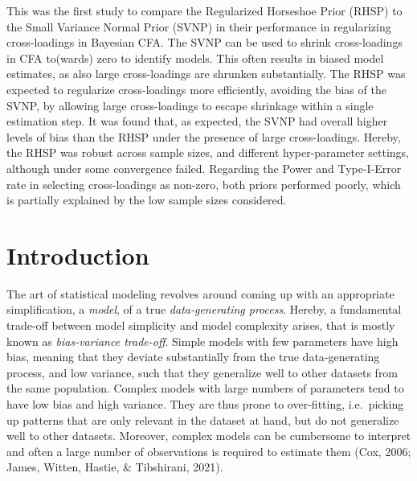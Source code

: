 \documentclass[
  man, donotrepeattitle,floatsintext]{apa6}
\begin{document}
This was the first study to compare the Regularized Horseshoe Prior (RHSP) to the Small Variance Normal Prior (SVNP) in their performance in regularizing cross-loadings in Bayesian CFA. The SVNP can be used to shrink cross-loadings in CFA to(wards) zero to identify models. This often results in biased model estimates, as also large cross-loadings are shrunken substantially. The RHSP was expected to regularize cross-loadings more efficiently, avoiding the bias of the SVNP, by allowing large cross-loadings to escape shrinkage within a single estimation step. It was found that, as expected, the SVNP had overall higher levels of bias than the RHSP under the presence of large cross-loadings. Hereby, the RHSP was robust across sample sizes, and different hyper-parameter settings, although under some convergence failed. Regarding the Power and Type-I-Error rate in selecting cross-loadings as non-zero, both priors performed poorly, which is partially explained by the low sample sizes considered.

\hypertarget{introduction}{%
\section{Introduction}\label{introduction}}

The art of statistical modeling revolves around coming up with an appropriate simplification, a \emph{model}, of a true \emph{data-generating process}. Hereby, a fundamental trade-off between model simplicity and model complexity arises, that is mostly known as \emph{bias-variance trade-off}. Simple models with few parameters have high bias, meaning that they deviate substantially from the true data-generating process, and low variance, such that they generalize well to other datasets from the same population. Complex models with large numbers of parameters tend to have low bias and high variance. They are thus prone to over-fitting, i.e.~picking up patterns that are only relevant in the dataset at hand, but do not generalize well to other datasets. Moreover, complex models can be cumbersome to interpret and often a large number of observations is required to estimate them (Cox, 2006; James, Witten, Hastie, \& Tibshirani, 2021).
\end{document}
